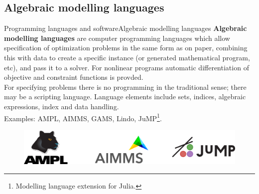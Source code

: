 \documentclass[handout]{beamer}
\begin{document}
\subsection{Algebraic modelling languages}
\begin{frame}[t]{Programming languages and software}{Algebraic modelling languages}
\textbf{Algebraic modelling languages} are computer programming languages which allow specification of optimization problems in the same form as on paper, combining this with data to create a specific instance (or generated mathematical program, etc), and pass it to a solver. For nonlinear programs automatic differentiation of objective and constraint functions is provded.\\[6pt]

For specifying problems there is no programming in the traditional sense; there may be a scripting language. Language elements include sets, indices, algebraic expressions, index and data handling.\\[6pt]

Examples: AMPL, AIMMS, GAMS, Lindo, JuMP\footnote[frame]{Modelling language extension for Julia.}.

\begin{figure}
\begin{center}
\includegraphics[width=.40\textwidth]{AML.png}
\end{center}
\end{figure}


\end{frame}

\end{document}
